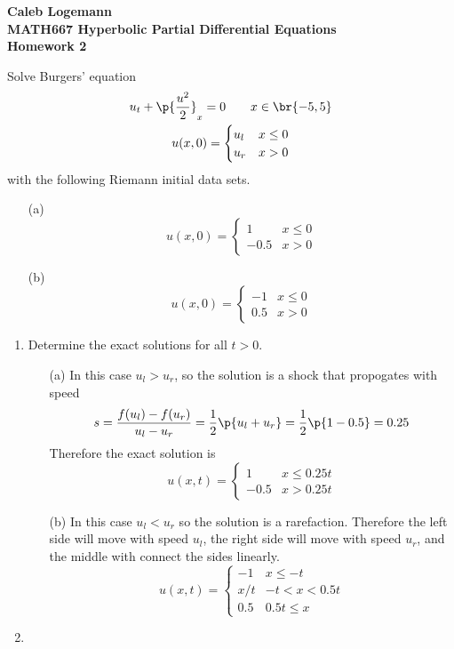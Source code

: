 \documentclass[11pt, oneside]{article}
\begin{document}
\noindent \textbf{\Large{Caleb Logemann \\
MATH667 Hyperbolic Partial Differential Equations \\
Homework 2
}}

%
Solve Burgers' equation
\begin{gather}
    u_t + \p{\frac{u^2}{2}}_x = 0 \qquad x \in \br{-5, 5} \\
    u(x, 0) = 
    \begin{cases}
      u_l & x \le 0 \\
      u_r & x > 0
    \end{cases}
\end{gather}
with the following Riemann initial data sets.

\begin{enumerate}
  \item[(a)]
    \[
      u(x, 0) =
      \begin{cases}
        1 & x \le 0 \\
        -0.5 & x > 0
      \end{cases}
    \]

  \item[(b)]
    \[
      u(x, 0) =
      \begin{cases}
        -1 & x \le 0 \\
        0.5 & x > 0
      \end{cases}
    \]
\end{enumerate}
\begin{enumerate}
  \item %
    Determine the exact solutions for all $t > 0$.
    \begin{enumerate}
      \item[(a)]
        In this case $u_l > u_r$, so the solution is a shock that propogates
        with speed
        \[
          s = \frac{f(u_l) - f(u_r)}{u_l - u_r} = \frac{1}{2} \p{u_l + u_r} = \frac{1}{2} \p{1 - 0.5} = 0.25
        \]
        Therefore the exact solution is
        \[
          u(x, t) =
          \begin{cases}
            1 & x \le 0.25 t \\
            -0.5 & x > 0.25 t
          \end{cases}
        \]

      \item[(b)]
        In this case $u_l < u_r$ so the solution is a rarefaction.
        Therefore the left side will move with speed $u_l$, the right side
        will move with speed $u_r$, and the middle with connect the sides linearly.
        \[
          u(x, t) =
          \begin{cases}
            -1 & x \le -t \\
            x/t & -t < x < 0.5t \\
            0.5 & 0.5 t \le x
          \end{cases}
        \]
    \end{enumerate}

  \item %
\end{enumerate}
\end{document}
